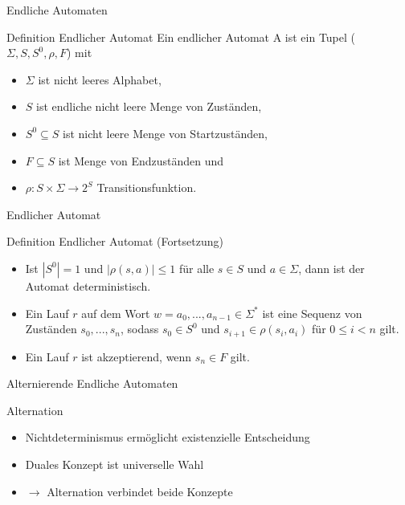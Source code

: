 
\begin{frame}{Endliche Automaten}
\begin{block}{Definition Endlicher Automat}
Ein endlicher Automat A ist ein Tupel ($\Sigma, S, S^0, \rho, F$) mit
\vspace{1em}
\begin{itemize}
\setlength\itemsep{1em}
\item $\Sigma$ ist nicht leeres Alphabet,
\item $S$ ist endliche nicht leere Menge von Zuständen,
\item $S^0\subseteq S$ ist nicht leere Menge von Startzuständen,
\item $F\subseteq S$ ist Menge von Endzuständen und
\item $\rho : S \times \Sigma \rightarrow 2^S$ Transitionsfunktion.
\end{itemize}
\end{block}
\end{frame}

\begin{frame}{Endlicher Automat}
\begin{block}{Definition Endlicher Automat (Fortsetzung)}
\begin{itemize}
\setlength\itemsep{1em}
\item Ist $|S^0|=1$ und $|\rho(s,a)|\leq 1$ für alle $s\in S$ und $a\in \Sigma$, dann ist der Automat deterministisch.
\pause
\item Ein Lauf $r$ auf dem Wort $w=a_0,...,a_{n-1}\in \Sigma^\ast$ ist eine Sequenz von Zuständen $s_0,...,s_n$, sodass $s_0\in S^0$ und $s_{i+1}\in \rho(s_i,a_i)$ für $0\leq i < n$ gilt.
\item Ein Lauf $r$ ist akzeptierend, wenn $s_n\in F$ gilt.
\end{itemize}
\end{block}
\end{frame}


\begin{frame}{Alternierende Endliche Automaten}
\begin{block}{Alternation}
\begin{itemize}[<+->]
\setlength\itemsep{1em}
\item Nichtdeterminismus ermöglicht existenzielle Entscheidung
\item Duales Konzept ist universelle Wahl
\item $\rightarrow$ Alternation verbindet beide Konzepte
\end{itemize}
\end{block}
\end{frame}

